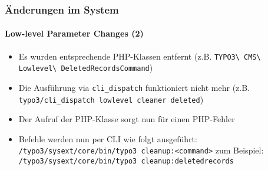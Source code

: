 \begin{frame}[fragile]
	\frametitle{Änderungen im System}
	\framesubtitle{Low-level Parameter Changes (2)}


	\begin{itemize}
		\item Es wurden entsprechende PHP-Klassen entfernt\newline
			\smaller(z.B. \texttt{TYPO3\textbackslash
				CMS\textbackslash
				Lowlevel\textbackslash
				DeletedRecordsCommand})
			\normalsize

		\item Die Ausführung via \texttt{cli\_dispatch} funktioniert nicht mehr\newline
			\smaller(z.B. \texttt{typo3/cli\_dispatch lowlevel cleaner deleted})\normalsize
		\item Der Aufruf der PHP-Klasse sorgt nun für einen PHP-Fehler

		\item Befehle werden nun per CLI wie folgt ausgeführt:\newline
			\smaller\texttt{/typo3/sysext/core/bin/typo3 cleanup:<command>}\normalsize\newline
			zum Beispiel:\newline
			\smaller\texttt{/typo3/sysext/core/bin/typo3 cleanup:deletedrecords}\normalsize

	\end{itemize}

\end{frame}




